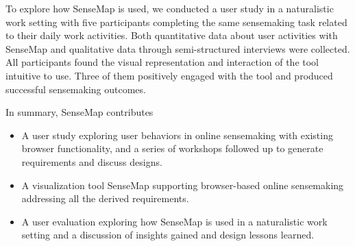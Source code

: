 To explore how SenseMap is used, we conducted a user study in a naturalistic work setting with five participants completing the same sensemaking task related to their daily work activities. Both quantitative data about user activities with SenseMap and qualitative data through semi-structured interviews were collected. All participants found the visual representation and interaction of the tool intuitive to use. Three of them positively engaged with the tool and produced successful sensemaking outcomes.

In summary, SenseMap contributes
\begin{itemize}
\item A user study exploring user behaviors in online sensemaking with existing browser functionality, and a series of workshops followed up to generate requirements and discuss designs.
\item A visualization tool SenseMap supporting browser-based online sensemaking addressing all the derived requirements.
\item A user evaluation exploring how SenseMap is used in a naturalistic work setting and a discussion of insights gained and design lessons learned.
\end{itemize}